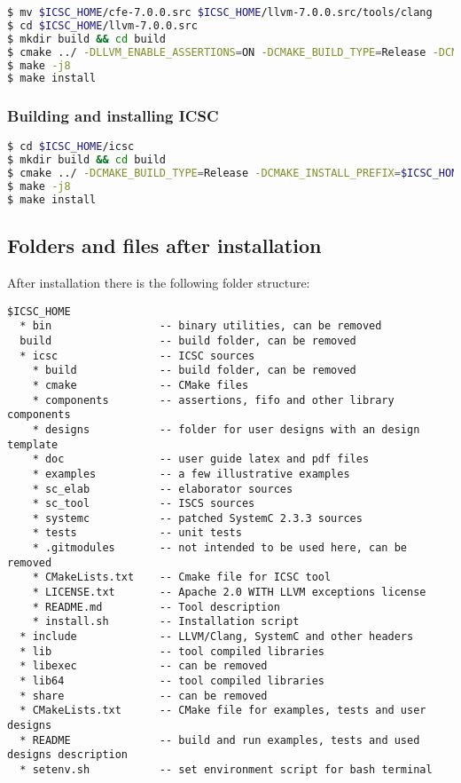 \begin{lstlisting}[language=bash]
$ mv $ICSC_HOME/cfe-7.0.0.src $ICSC_HOME/llvm-7.0.0.src/tools/clang
$ cd $ICSC_HOME/llvm-7.0.0.src
$ mkdir build && cd build
$ cmake ../ -DLLVM_ENABLE_ASSERTIONS=ON -DCMAKE_BUILD_TYPE=Release -DCMAKE_INSTALL_PREFIX=$ICSC_HOME
$ make -j8
$ make install
\end{lstlisting}


\subsubsection{Building and installing ICSC}

\begin{lstlisting}[language=bash]
$ cd $ICSC_HOME/icsc
$ mkdir build && cd build
$ cmake ../ -DCMAKE_BUILD_TYPE=Release -DCMAKE_INSTALL_PREFIX=$ICSC_HOME
$ make -j8
$ make install
\end{lstlisting}


\subsection{Folders and files after installation}

After installation there is the following folder structure:
%
\begin{lstlisting}
$ICSC_HOME
  * bin                 -- binary utilities, can be removed
  build                 -- build folder, can be removed
  * icsc                -- ICSC sources
    * build             -- build folder, can be removed        
    * cmake             -- CMake files
    * components        -- assertions, fifo and other library components
    * designs           -- folder for user designs with an design template
    * doc               -- user guide latex and pdf files
    * examples          -- a few illustrative examples 
    * sc_elab           -- elaborator sources 
    * sc_tool           -- ISCS sources  
    * systemc           -- patched SystemC 2.3.3 sources
    * tests             -- unit tests 
    * .gitmodules       -- not intended to be used here, can be removed
    * CMakeLists.txt    -- Cmake file for ICSC tool
    * LICENSE.txt       -- Apache 2.0 WITH LLVM exceptions license
    * README.md         -- Tool description
    * install.sh        -- Installation script
  * include             -- LLVM/Clang, SystemC and other headers
  * lib                 -- tool compiled libraries
  * libexec             -- can be removed
  * lib64               -- tool compiled libraries
  * share               -- can be removed  
  * CMakeLists.txt      -- CMake file for examples, tests and user designs
  * README              -- build and run examples, tests and used designs description
  * setenv.sh           -- set environment script for bash terminal  
\end{lstlisting}


